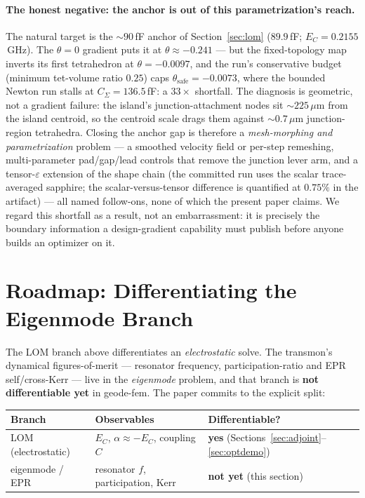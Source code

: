 \documentclass{anvil-paper}
\begin{document}
\paragraph{The honest negative: the anchor is out of this
parametrization's reach.} The natural target is the ${\sim}90$\,fF
anchor of Section~\ref{sec:lom} ($89.9$\,fF; $E_C = 0.2155$\,GHz). The
$\theta = 0$ gradient puts it at $\theta \approx -0.241$ --- but the
fixed-topology map inverts its first tetrahedron at $\theta = -0.0097$,
and the run's conservative budget (minimum tet-volume ratio $0.25$) caps
$\theta_{\mathrm{safe}} = -0.0073$, where the bounded Newton run stalls
at $C_\Sigma = 136.5$\,fF: a $33\times$ shortfall. The diagnosis is
geometric, not a gradient failure: the island's junction-attachment
nodes sit ${\sim}225\,\mu$m from the island centroid, so the centroid
scale drags them against ${\sim}0.7\,\mu$m junction-region tetrahedra.
Closing the anchor gap is therefore a \emph{mesh-morphing and
parametrization} problem --- a smoothed velocity field or per-step
remeshing, multi-parameter pad/gap/lead controls that remove the
junction lever arm, and a tensor-$\varepsilon$ extension of the shape
chain (the committed run uses the scalar trace-averaged sapphire; the
scalar-versus-tensor difference is quantified at $0.75\%$ in the
artifact) --- all named follow-ons, none of which the present paper
claims. We regard this shortfall as a result, not an embarrassment: it
is precisely the boundary information a design-gradient capability must
publish before anyone builds an optimizer on it.

\section{Roadmap: Differentiating the Eigenmode Branch}
\label{sec:roadmap}

The LOM branch above differentiates an \emph{electrostatic} solve. The
transmon's dynamical figures-of-merit --- resonator frequency,
participation-ratio and EPR self/cross-Kerr \citep{minev2021,nigg2012}
--- live in the \emph{eigenmode} problem, and that branch is \textbf{not
differentiable yet} in geode-fem. The paper commits to the explicit
split:

\begin{table}[h]
  \centering
  \small
  \begin{tabular}{@{}lll@{}}
    \toprule
    Branch & Observables & Differentiable? \\
    \midrule
    LOM (electrostatic) & $E_C$, $\alpha \approx -E_C$, coupling $C$ &
      \textbf{yes} (Sections~\ref{sec:adjoint}--\ref{sec:optdemo}) \\
    eigenmode / EPR & resonator $f$, participation, Kerr &
      \textbf{not yet} (this section) \\
    \bottomrule
  \end{tabular}
\end{table}
\end{document}
